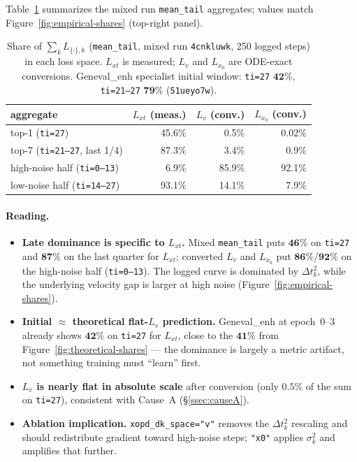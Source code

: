 \documentclass[11pt,a4paper]{article}
\newcommand{\dt}{\Delta t}
\begin{document}
Table~\ref{tab:empirical-converted} summarizes the mixed run \texttt{mean\_tail} aggregates; values
match Figure~\ref{fig:empirical-shares} (top-right panel).

\begin{table}[ht]
\centering
\footnotesize
\renewcommand{\arraystretch}{1.12}
\begin{tabular}{@{}lrrr@{}}
\toprule
\textbf{aggregate} & \textbf{$L_{xt}$ (meas.)} & \textbf{$L_v$ (conv.)} & \textbf{$L_{x_0}$ (conv.)} \\
\midrule
top-1 (\texttt{ti=27}) & 45.6\% & 0.5\% & 0.02\% \\
top-7 (\texttt{ti=21--27}, last 1/4) & 87.3\% & 3.4\% & 0.9\% \\
high-noise half (\texttt{ti=0--13}) & 6.9\% & 85.9\% & 92.1\% \\
low-noise half (\texttt{ti=14--27}) & 93.1\% & 14.1\% & 7.9\% \\
\bottomrule
\end{tabular}
\caption{Share of $\sum_k L_{\{\cdot\},k}$ (\texttt{mean\_tail}, mixed run \texttt{4cnkluwk},
250 logged steps) in each loss space. $L_{xt}$ is measured; $L_v$ and $L_{x_0}$ are ODE-exact
conversions. Geneval\_enh specialist initial window: \texttt{ti=27} $\mathbf{42\%}$,
\texttt{ti=21--27} $\mathbf{79\%}$ (\texttt{51ueyo7w}).}
\label{tab:empirical-converted}
\end{table}

\paragraph{Reading.}
\begin{itemize}[leftmargin=1.5em]
\item \textbf{Late dominance is specific to $L_{xt}$.} Mixed \texttt{mean\_tail} puts
$\mathbf{46\%}$ on \texttt{ti=27} and $\mathbf{87\%}$ on the last quarter for $L_{xt}$; converted
$L_v$ and $L_{x_0}$ put $\mathbf{86\%}$/$\mathbf{92\%}$ on the high-noise half
(\texttt{ti=0--13}). The logged curve is dominated by $\dt_k^2$, while the underlying velocity gap
is larger at high noise (Figure~\ref{fig:empirical-shares}).
\item \textbf{Initial $\approx$ theoretical flat-$L_v$ prediction.} Geneval\_enh at epoch~0--3 already
shows $\mathbf{42\%}$ on \texttt{ti=27} for $L_{xt}$, close to the $\mathbf{41\%}$ from
Figure~\ref{fig:theoretical-shares} --- the dominance is largely a metric artifact, not something
training must ``learn'' first.
\item \textbf{$L_v$ is nearly flat in absolute scale} after conversion (only $\mathbf{0.5\%}$ of the
sum on \texttt{ti=27}), consistent with Cause~A (\S\ref{ssec:causeA}).
\item \textbf{Ablation implication.} \texttt{xopd\_dk\_space="v"} removes the $\dt_k^2$ rescaling
and should redistribute gradient toward high-noise steps; \texttt{"x0"} applies $\sigma_k^2$ and
amplifies that further.
\end{itemize}
\end{document}

